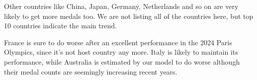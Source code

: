 Other countries like China, Japan, Germany, Netherlands and so on are very likely to get more medals too. We are not listing all of the countries here, but top 10 countries indicate the main trend.

France is sure to do worse after an excellent performance in the 2024 Paris Olympics, since it's not host country any more. Italy is likely to maintain its performance, while Australia is estimated by our model to do worse although their medal counts are seemingly increasing recent years.